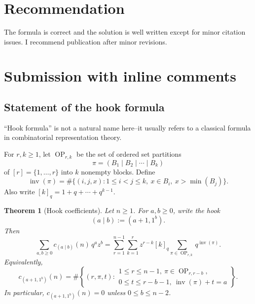 \documentclass[12pt]{article}
\newtheorem{theorem}{Theorem}
\DeclareMathOperator{\Hilb}{Hilb}
\DeclareMathOperator{\Inv}{inv}
\DeclareMathOperator{\OP}{OP}
\newcommand{\review}[1]{\begin{reviewbox}#1\end{reviewbox}}
\begin{document}
\section{Recommendation}
The formula is correct and the solution is well written except for minor citation issues. I recommend publication after minor revisions.


  \section{Submission with inline comments}


\date{}



\begin{abstract}
Let \(R_n^{(m)}\) be the diagonal coinvariant algebra of \(\mathfrak S_n\) in
\(m\) sets of \(n\) commuting variables, and write
\[
\Hilb(R_n^{(m)};q_1,\dots,q_m)
=
\sum_{\lambda} c_\lambda(n)s_\lambda(q_1,\dots,q_m).
\]
For hook shapes \(\lambda=(a+1,1^b)\), we give a positive ordered-set-partition
interpretation of \(c_\lambda(n)\).
\end{abstract}

\subsection{Statement of the hook formula}
\review{``Hook formula'' is not a natural name here–it usually refers to a classical formula in combinatorial representation theory.}

For \(r,k\geq 1\), let \(\OP_{r,k}\) be the set of ordered set partitions
\[
\pi=(B_1\mid B_2\mid \cdots \mid B_k)
\]
of \([r]=\{1,\dots,r\}\) into \(k\) nonempty blocks. Define
\[
\Inv(\pi)
=
\#\{(i,j,x): 1\leq i<j\leq k,\ x\in B_i,\ x>\min(B_j)\}.
\]
Also write \([k]_q=1+q+\cdots+q^{k-1}\).

\begin{theorem}[Hook coefficients]
Let \(n\geq 1\). For \(a,b\geq 0\), write the hook
\[
(a\mid b):=(a+1,1^b).
\]
Then
\[
\boxed{
\sum_{a,b\geq 0} c_{(a\mid b)}(n)\,q^a z^b
=
\sum_{r=1}^{n-1}\sum_{k=1}^{r}
z^{r-k}[k]_q
\sum_{\pi\in \OP_{r,k}} q^{\Inv(\pi)}.
}
\]
Equivalently,
\[
\boxed{
c_{(a+1,1^b)}(n)
=
\#\left\{
(r,\pi,t):
\begin{array}{l}
1\leq r\leq n-1,\ \pi\in \OP_{r,r-b},\\
0\leq t\leq r-b-1,\ \Inv(\pi)+t=a
\end{array}
\right\}.
}
\]
In particular, \(c_{(a+1,1^b)}(n)=0\) unless \(0\leq b\leq n-2\).
\end{theorem}
\end{document}
